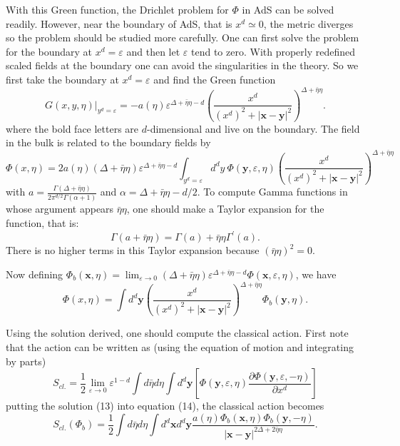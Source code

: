 \documentclass[a4paper,11pt]{article}
\begin{document}
With this Green function, the Drichlet problem for $\Phi$ in AdS
can be solved readily. However, near the boundary of AdS, that is
$x^d \simeq 0$,  the metric diverges so the problem should be
studied more carefully. One can first solve the problem for the
boundary at $x^d=\varepsilon$ and then let $\varepsilon$ tend to
zero. With properly redefined scaled fields at the boundary one
can avoid the singularities in the theory. So we first take the
boundary at $ x^d=\varepsilon$ and find the Green function
\cite{Muck}
\begin{equation}\label{Green}
G(x,y,\eta)|_{y^d=\varepsilon}=-a(\eta)\varepsilon^
{\Delta+\bar{\eta}\eta-d}
\left(\frac{x^d}{(x^d)^2+|\mathbf{x-y}|^2}\right)^
{\Delta+\bar{\eta}\eta}.
\end{equation}
where the bold face letters are $d$-dimensional and live on the
boundary. The field in the bulk is related to the boundary fields
by
\begin{equation}  \label{b to b}
\Phi(x,\eta)=2a(\eta)(\Delta+\bar{\eta}\eta)\varepsilon^{\Delta+\bar{\eta}
\eta-d} \int_{y^d=\varepsilon} d^d y\:
\Phi(\mathbf{y},\varepsilon,\eta)
\left(\frac{x^d}{(x^d)^2+|\mathbf{x-y}|^2}\right)^
{\Delta+\bar{\eta}\eta}
\end{equation}
with $a=\frac{\Gamma(\Delta+\bar{\eta}\eta)}{2\pi^{d/2}
\Gamma(\alpha+1)}$ and $\alpha=\Delta+\bar{\eta}\eta-d/2$. To
compute Gamma functions in whose argument appears
$\bar{\eta}\eta$, one should make a Taylor expansion for the
function, that is: \begin{equation}
\Gamma(a+\bar{\eta}\eta)=\Gamma(a)+\bar{\eta}\eta\Gamma^{\prime}(a).
\end{equation} There is no higher terms in this Taylor expansion
because $(\bar{\eta} \eta)^2=0$.

Now defining
$\Phi_b(\mathbf{x},\eta)=\lim_{\varepsilon\rightarrow0} (\Delta+
\bar{\eta}\eta)\varepsilon^{\Delta+\bar{\eta}\eta-d}\Phi(\mathbf{x}
,\varepsilon,\eta)$, we have
\begin{equation}
\Phi(x,\eta)=\int d^d \mathbf{y}
\left(\frac{x^d}{(x^d)^2+|\mathbf{x-y}|^2} \right)^
{\Delta+\bar{\eta}\eta} \Phi_b(\mathbf{y},\eta).
\end{equation}

Using the solution derived, one should compute the classical action. First
note that the action can be written as (using the equation of motion and
integrating by parts)
\begin{equation}  \label{j}
S_{cl.}=\frac{1}{2} \lim_{\varepsilon\rightarrow 0}
\varepsilon^{1-d} \int d \bar{\eta}d \eta \int d^d \mathbf{y}
\left[\Phi(\mathbf{y},\varepsilon,\eta) \frac{\partial
\Phi(\mathbf{y},\varepsilon,-\eta)}{\partial x^d}\right]
\end{equation}
putting the solution (13) into equation (14), the classical
action becomes
\begin{equation}  \label{dd}
S_{cl.}(\Phi_b)=\frac{1}{2}\int d \bar{\eta}d \eta \int d^d
\mathbf{x} d^d \mathbf{y} \frac{a(\eta)
\Phi_b(\mathbf{x},\eta)\Phi_b(\mathbf{y},-\eta)}{|
\mathbf{x-y}|^{2\Delta+2\bar{\eta}\eta}}.
\end{equation}
\end{document}
